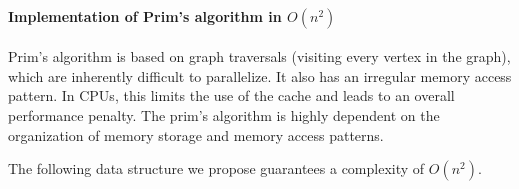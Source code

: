 \newpage

\paragraph{Implementation of Prim's algorithm in $O\left(n^{2}\right)$}

Prim's algorithm is based on graph traversals (visiting every vertex in the graph), which are inherently difficult to parallelize. It also has an irregular memory access pattern. In CPUs, this limits the use of the cache and leads to an overall performance penalty. The prim's algorithm is highly dependent on the organization of memory storage and memory access patterns.\cite{10.1007/978-3-642-38853-8_14}

\highspace
The following data structure we propose guarantees a complexity of $O\left(n^{2}\right)$.
